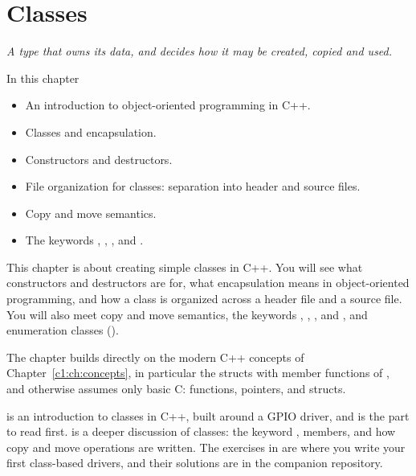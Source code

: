 
\chapter{Classes}
\label{c2:ch:classes}

{\large\itshape A type that owns its data, and decides how it may be created, copied and
used.\par}

\begin{chapterbox}{In this chapter}
\begin{itemize}
  \item An introduction to object-oriented programming in C++.
  \item Classes and encapsulation.
  \item Constructors and destructors.
  \item File organization for classes: separation into header and source files.
  \item Copy and move semantics.
  \item The keywords , , , and .
\end{itemize}
\end{chapterbox}

This chapter is about creating simple classes in C++. You will see what constructors and
destructors are for, what encapsulation means in object-oriented programming, and how a class is
organized across a header file and a source file. You will also meet copy and move semantics, the
keywords , , , and , and enumeration classes
().

The chapter builds directly on the modern C++ concepts of Chapter~\ref{c1:ch:concepts}, in
particular the structs with member functions of , and otherwise assumes only
basic C: functions, pointers, and structs.

 is an introduction to classes in C++, built around a GPIO driver, and is
the part to read first.  is a deeper discussion of classes: the keyword
,  members, and how copy and move operations are written. The
exercises in  are where you write your first class-based drivers, and
their solutions are in the companion repository.





